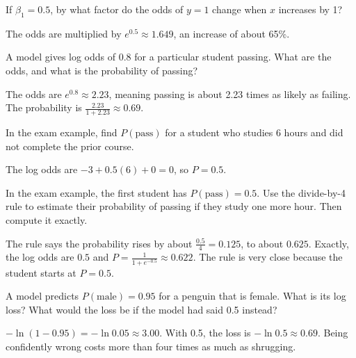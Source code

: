 \begin{Exercise}[label=slog3, title=Interpret the odds ratio]
If $\beta_1 = 0.5$, by what factor do the odds of $y = 1$ change when $x$ increases by 1?
\end{Exercise}
\begin{Answer}[ref=slog3]
The odds are multiplied by $e^{0.5} \approx 1.649$, an increase of about 65\%.
\end{Answer}

\begin{Exercise}[label=slog4, title=From odds to probability]
A model gives log odds of $0.8$ for a particular student passing. What are the odds, and what is the
probability of passing?
\end{Exercise}
\begin{Answer}[ref=slog4]
The odds are $e^{0.8} \approx 2.23$, meaning passing is about 2.23 times as likely as failing. The probability
is $\frac{2.23}{1 + 2.23} \approx 0.69$.
\end{Answer}

\begin{Exercise}[label=mlog1, title=Compute a probability]
In the exam example, find $P(\text{pass})$ for a student who studies 6 hours and did not complete the prior
course.
\end{Exercise}
\begin{Answer}[ref=mlog1]
The log odds are $-3 + 0.5(6) + 0 = 0$, so $P = 0.5$.
\end{Answer}

\begin{Exercise}[label=mlog3, title=Divide by 4]
In the exam example, the first student has $P(\text{pass}) = 0.5$. Use the divide-by-4 rule to estimate their
probability of passing if they study one more hour. Then compute it exactly.
\end{Exercise}
\begin{Answer}[ref=mlog3]
The rule says the probability rises by about $\frac{0.5}{4} = 0.125$, to about $0.625$. Exactly, the log odds
are $0.5$ and $P = \frac{1}{1 + e^{-0.5}} \approx 0.622$. The rule is very close because the student starts at
$P = 0.5$.
\end{Answer}

\begin{Exercise}[label=mlog2, title=Log loss by hand, space=3cm]
A model predicts $P(\text{male}) = 0.95$ for a penguin that is female. What is its log loss? What would the
loss be if the model had said 0.5 instead?
\end{Exercise}
\begin{Answer}[ref=mlog2]
$-\ln(1 - 0.95) = -\ln 0.05 \approx 3.00$. With 0.5, the loss is $-\ln 0.5 \approx 0.69$. Being confidently
wrong costs more than four times as much as shrugging.
\end{Answer}

